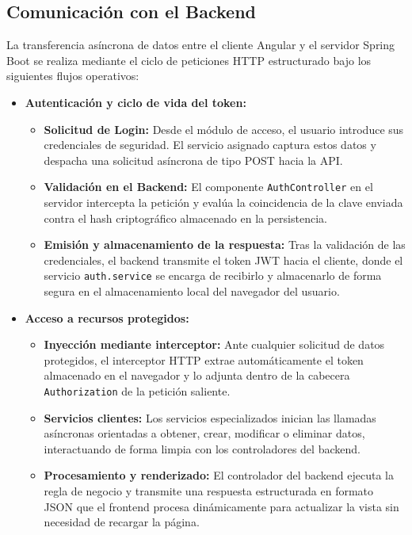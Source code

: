 \subsection{Comunicación con el Backend}
La transferencia asíncrona de datos entre el cliente Angular y el servidor Spring Boot se realiza mediante el ciclo de peticiones HTTP estructurado bajo los siguientes flujos operativos:

\begin{itemize}
    \item \textbf{Autenticación y ciclo de vida del token:}
    \begin{itemize}
        \item \textbf{Solicitud de Login:} Desde el módulo de acceso, el usuario introduce sus credenciales de seguridad. El servicio asignado captura estos datos y despacha una solicitud asíncrona de tipo POST hacia la API.
        \item \textbf{Validación en el Backend:} El componente \texttt{AuthController} en el servidor intercepta la petición y evalúa la coincidencia de la clave enviada contra el hash criptográfico almacenado en la persistencia.
        \item \textbf{Emisión y almacenamiento de la respuesta:} Tras la validación de las credenciales, el backend transmite el token JWT hacia el cliente, donde el servicio \texttt{auth.service} se encarga de recibirlo y almacenarlo de forma segura en el almacenamiento local del navegador del usuario.
    \end{itemize}
    \item \textbf{Acceso a recursos protegidos:}
    \begin{itemize}
        \item \textbf{Inyección mediante interceptor:} Ante cualquier solicitud de datos protegidos, el interceptor HTTP extrae automáticamente el token almacenado en el navegador y lo adjunta dentro de la cabecera \texttt{Authorization} de la petición saliente.
        \item \textbf{Servicios clientes:} Los servicios especializados inician las llamadas asíncronas orientadas a obtener, crear, modificar o eliminar datos, interactuando de forma limpia con los controladores del backend.
        \item \textbf{Procesamiento y renderizado:} El controlador del backend ejecuta la regla de negocio y transmite una respuesta estructurada en formato JSON que el frontend procesa dinámicamente para actualizar la vista sin necesidad de recargar la página.
    \end{itemize}
\end{itemize}